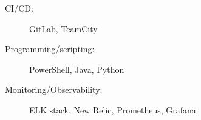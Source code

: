 \begin{minipage}[t]{.5\linewidth}
  \begin{description}
    \item[CI/CD:] GitLab, TeamCity
  \end{description}
\end{minipage}

\begin{minipage}[t]{.5\linewidth}
  \begin{description}
    \item[Programming/scripting:] PowerShell, Java, Python
  \end{description}
\end{minipage}

\begin{minipage}[t]{.5\linewidth}
  \begin{description}
    \item[Monitoring/Observability:] ELK stack, New Relic, Prometheus, Grafana
  \end{description}
\end{minipage}
